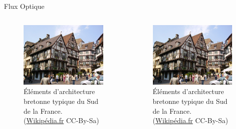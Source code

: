 \documentclass{bredelebeamer}
\begin{document}
\begin{frame}{Flux Optique}

\begin{columns}

\begin{column}{0.3\textwidth}
\begin{figure}
\centering
\includegraphics[scale=0.5]{images/architecturebretonne_wikipedia.jpg}
\caption{Éléments d'architecture bretonne typique du Sud de la France. (\href{http://commons.wikimedia.org/wiki/File:Colmar_-_Alsace.jpg}{Wikipédia.fr} CC-By-Sa)}
\end{figure}
\end{column}


\begin{column}{0.3\textwidth}
\begin{figure}
\centering
\includegraphics[scale=0.5]{images/architecturebretonne_wikipedia.jpg}
\caption{Éléments d'architecture bretonne typique du Sud de la France. (\href{http://commons.wikimedia.org/wiki/File:Colmar_-_Alsace.jpg}{Wikipédia.fr} CC-By-Sa)}
\end{figure}
\end{column}


\end{columns}
\end{frame}
\end{document}
